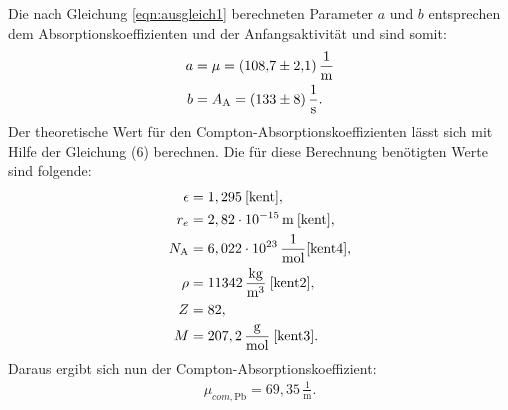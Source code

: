 \noindent Die nach Gleichung \eqref{eqn:ausgleich1} berechneten Parameter $a$ und $b$ entsprechen dem Absorptionskoeffizienten und der Anfangsaktivität und sind somit:
\begin{align*}
a &= \mu = (\num{108.7 +- 2.1})\,\frac{1}{\si{\meter}} \\
b &= A_\text{A} = (\num{133 +- 8})\,\frac{1}{\si{\second}}.
\end{align*}
Der theoretische Wert für den Compton-Absorptionskoeffizienten lässt sich mit Hilfe der Gleichung (6) berechnen.
Die für diese Berechnung benötigten Werte sind folgende:
\begin{align*}
\epsilon &= 1,295 \: \text{\cite[S.243]{kent}} ,\\
r_e &= 2,82 \cdot 10^{-15}\,\si{\meter} \: \text{\cite[S.235]{kent}} ,\\
N_\text{A} &= 6,022 \cdot 10^{23} \,\frac{1}{\si{\mol}} \text{\cite{kent4}},\\
\rho &= 11342\,\frac{\si{\kilo\gram}}{\si{\cubic\meter}} \: \text{\cite{kent2}},\\
Z &= 82 ,\\
M &= 207,2\,\frac{\si{\gram}}{\si{\mol}} \: \text{\cite{kent3}}.
\end{align*}
Daraus ergibt sich nun der Compton-Absorptionskoeffizient:
\begin{align*}
  \mu_{com, \text{Pb}} = 69,35\,\frac{1}{\si{\meter}}.
\end{align*}

